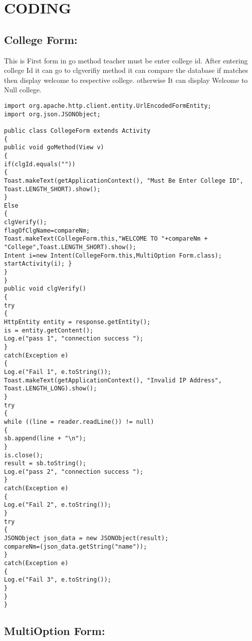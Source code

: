 
\chapter{CODING}
\section {College Form:} 

This is First form in go method teacher must be enter college id. After entering college Id it can go to clgverifiy method it can compare the database if matches then display welcome to respective college. otherwise It can display Welcome to Null college.


\begin{lstlisting}
import org.apache.http.client.entity.UrlEncodedFormEntity;
import org.json.JSONObject;

public class CollegeForm extends Activity 
{
public void goMethod(View v)
{
if(clgId.equals(""))
{
Toast.makeText(getApplicationContext(), "Must Be Enter College ID", Toast.LENGTH_SHORT).show();
}
Else
{
clgVerify();
flagOfClgName=compareNm;
Toast.makeText(CollegeForm.this,"WELCOME TO "+compareNm +  "College",Toast.LENGTH_SHORT).show();
Intent i=new Intent(CollegeForm.this,MultiOption Form.class);
startActivity(i); }
}
}
public void clgVerify()
{
try
{
HttpEntity entity = response.getEntity();
is = entity.getContent();
Log.e("pass 1", "connection success ");
}
catch(Exception e)
{
Log.e("Fail 1", e.toString());
Toast.makeText(getApplicationContext(), "Invalid IP Address",
Toast.LENGTH_LONG).show();
}
try
{
while ((line = reader.readLine()) != null)
{
sb.append(line + "\n");
}
is.close();
result = sb.toString();
Log.e("pass 2", "connection success ");
}
catch(Exception e)
{
Log.e("Fail 2", e.toString());
}
try
{
JSONObject json_data = new JSONObject(result);
compareNm=(json_data.getString("name"));
}
catch(Exception e)
{
Log.e("Fail 3", e.toString());
}
}
}
\end{lstlisting}

\section{MultiOption Form:}

